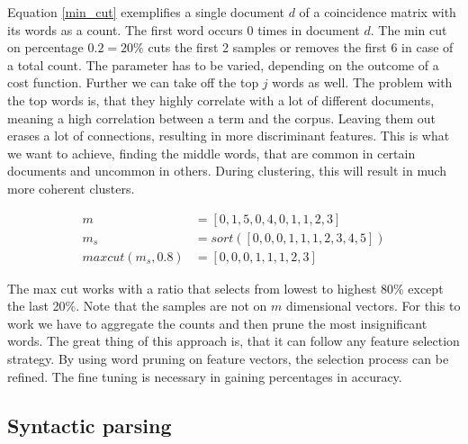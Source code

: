     Equation \ref{min_cut} exemplifies a single document $d$ of a coincidence matrix with its words as a count. The first word occurs 0 times in document $d$. The min cut on percentage $0.2 = 20\%$ cuts the first 2 samples or removes the first 6 in case of a total count. The parameter has to be varied, depending on the outcome of a cost function. Further we can take off the top $j$ words as well. The problem with the top words is, that they highly correlate with a lot of different documents, meaning a high correlation between a term and the corpus. Leaving them out erases a lot of connections, resulting in more discriminant features. This is what we want to achieve, finding the middle words, that are common in certain documents and uncommon in others. During clustering, this will result in much more coherent clusters.

      \begin{equation}
      \begin{split}
        m &= [0, 1, 5, 0, 4, 0, 1, 1, 2, 3] \\
        m_s &= sort( [0, 0, 0, 1, 1, 1, 2, 3, 4, 5] ) \\
        maxcut(m_s, 0.8) &= [0, 0, 0, 1, 1, 1, 2, 3]
      \end{split}
      \end{equation}

    The max cut works with a ratio that selects from lowest to highest 80\% except the last 20\%. Note that the samples are not on $m$ dimensional vectors. For this to work we have to aggregate the counts and then prune the most insignificant words. The great thing of this approach is, that it can follow any feature selection strategy. By using word pruning on feature vectors, the selection process can be refined. The fine tuning is necessary in gaining percentages in accuracy.

  \subsection{Syntactic parsing}
  \label{sec:syntactic_parsing}

